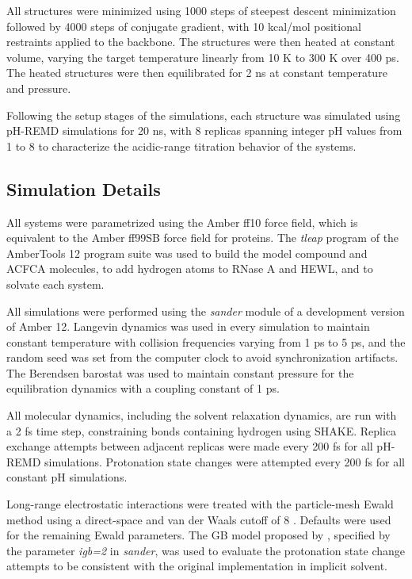 All structures were minimized using 1000 steps of steepest descent minimization
followed by 4000 steps of conjugate gradient, with 10 kcal/mol positional
restraints applied to the backbone. The structures were then heated at constant
volume, varying the target temperature linearly from 10 K to 300 K over 400 ps.
The heated structures were then equilibrated for 2 ns at constant temperature
and pressure.

Following the setup stages of the simulations, each structure was simulated
using pH-REMD simulations for 20 ns, with 8 replicas spanning integer pH values
from 1 to 8 to characterize the acidic-range titration behavior of the systems.

\subsection{Simulation Details}

All systems were parametrized using the Amber ff10 force field, which is
equivalent to the Amber ff99SB force field for proteins.
\cite{Hornak_Proteins_2006_v65_p712} The \emph{tleap} program of the AmberTools
12 program suite was used to build the model compound and ACFCA molecules, to
add hydrogen atoms to RNase A and HEWL, and to solvate each system.

All simulations were performed using the \emph{sander} module of a development
version of Amber 12. \cite{AMBER12} Langevin dynamics was used in every
simulation to maintain constant temperature with collision frequencies varying
from 1 ps to 5 ps, and the random seed was set from
the computer clock to avoid synchronization artifacts.
\cite{Uberuaga_JChemPhys_2004_v120_p6363,
Sindhikara_JChemTheoryComput_2009_v5_p1624} The Berendsen barostat was used to
maintain constant pressure for the equilibration dynamics with a coupling
constant of 1 ps.

All molecular dynamics, including the solvent relaxation dynamics, are run with
a 2 fs time step, constraining bonds containing hydrogen using SHAKE.
\cite{Ryckaert_JComputPhys_1977_v23_p327, Miyamoto_JComputChem_1992_v13_p952}
Replica exchange attempts between adjacent replicas were made every 200 fs for
all pH-REMD simulations. Protonation state changes were attempted every 200 fs
for all constant pH simulations.

Long-range electrostatic interactions were treated with the particle-mesh Ewald
method \cite{Darden_JChemPhys_1993_v98_p10089,
Essmann_JChemPhys_1995_v103_p8577} using a direct-space and van der Waals cutoff
of 8 \text{\AA}. Defaults were used for the remaining Ewald parameters. The GB
model proposed by \citeauthor{Onufriev_Proteins_2004_v55_p383}, specified by the
parameter \emph{igb=2} in \emph{sander}, \cite{Onufriev_Proteins_2004_v55_p383}
was used to evaluate the protonation state change attempts to be consistent with
the original implementation in implicit solvent.
\cite{Mongan_JComputChem_2004_v25_p2038}

